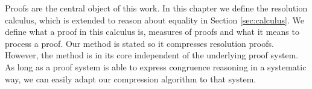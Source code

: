 Proofs are the central object of this work.
In this chapter we define the resolution calculus, which is extended to reason about equality in Section \ref{sec:calculus}.
We define what a proof in this calculus is, measures of proofs and what it means to process a proof.
Our method is stated so it compresses resolution proofs.
However, the method is in its core independent of the underlying proof system.
As long as a proof system is able to express congruence reasoning in a systematic way, we can easily adapt our compression algorithm to that system.





